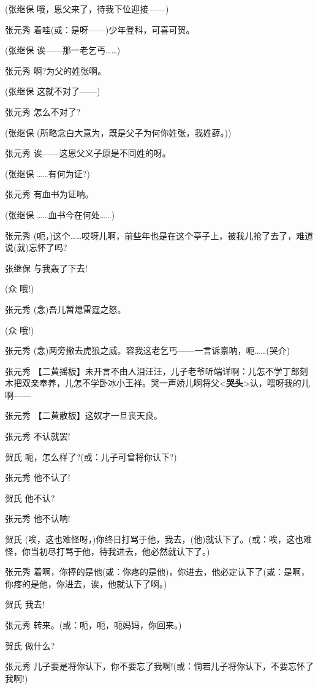(张继保 哦，恩父来了，待我下位迎接------)

张元秀 着哇(或：是呀------)少年登科，可喜可贺。

(张继保 诶------那一老乞丐\ldots{}\ldots{})

张元秀 啊?为父的姓张啊。

(张继保 这就不对了------)

张元秀 怎么不对了?

(张继保 (所略念白大意为，既是父子为何你姓张，我姓薛。))

张元秀 诶------这恩父义子原是不同姓的呀。

(张继保 \ldots{}\ldots{}有何为证?)

张元秀 有血书为证呐。

(张继保 \ldots{}\ldots{}血书今在何处\ldots{}\ldots{})

张元秀
(呃，)这个\ldots{}\ldots{}哎呀儿啊，前些年也是在这个亭子上，被我儿抢了去了，难道说(就)忘怀了吗?

张继保 与我轰了下去!

(众 哦!)

张元秀 (念)吾儿暂熄雷霆之怒。

(众 哦!)

张元秀
(念)两旁撤去虎狼之威。容我这老乞丐------一言诉禀呐，呃\ldots{}\ldots{}(哭介)

张元秀
【二黄摇板】未开言不由人泪汪汪，儿子老爷听端详啊：儿怎不学丁郎刻木把双亲奉养，儿怎不学卧冰小王祥。哭一声娇儿啊将父\textless{}\textbf{哭头}\textgreater{}认，喂呀我的儿啊------

张元秀 【二黄散板】这奴才一旦丧天良。

张元秀 不认就罢!

贺氏 呃，怎么样了?(或：儿子可曾将你认下?)

张元秀 他不认了!

贺氏 他不认?

张元秀 他不认呐!

贺氏
(唉，这也难怪呀，)你终日打骂于他，我去，(他)就认下了。(或：唉，这也难怪，你当初尽打骂于他，待我进去，他必然就认下了。)

张元秀
着啊，你捧的是他(或：你疼的是他)，你进去，他必定认下了(或：是啊，你疼的是他，你进去，诶，他就认下了啊。)

贺氏 我去!

张元秀 转来。(或：呃，呃，呃妈妈，你回来。)

贺氏 做什么?

张元秀
儿子要是将你认下，你不要忘了我啊!(或：倘若儿子将你认下，不要忘怀了我啊!)

